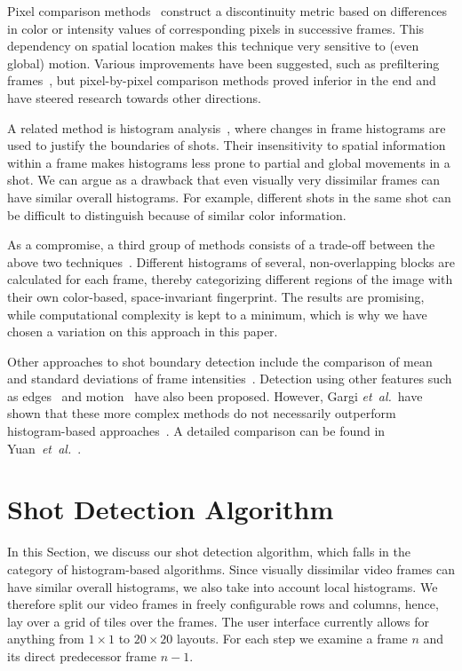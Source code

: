 \documentclass{acm_proc_article-sp}
\begin{document}
Pixel comparison methods~\cite{Hampapur1994, Zhang1993} construct a discontinuity metric based on differences in color or intensity values of corresponding pixels in successive frames. This dependency on spatial location makes this technique very sensitive to (even global) motion. Various improvements have been suggested, such as prefiltering frames~\cite{Zhang1995}, but pixel-by-pixel comparison methods proved inferior in the end and have steered research towards other directions.

A related method is histogram analysis~\cite{Smeaton1999}, where changes in frame histograms are used to justify the boundaries of shots. Their insensitivity to spatial information within a frame makes histograms less prone to partial and global movements in a shot. We can argue as a drawback that even visually very dissimilar frames can have similar overall histograms. For example, different shots in the same shot can be difficult to distinguish because of similar color information.

As a compromise, a third group of methods consists of a trade-off between the above two techniques~\cite{Ahmed1999}. Different histograms of several, non-overlapping blocks are calculated for each frame, thereby categorizing different regions of the image with their own color-based, space-invariant fingerprint. The results are promising, while computational complexity is kept to a minimum, which is why we have chosen a variation on this approach in this paper.

Other approaches to shot boundary detection include the comparison of mean and standard deviations of frame intensities~\cite{Lienhart1999}. Detection using other features such as edges~\cite{Zabih1995} and motion~\cite{Bouthemy1997} have also been proposed. However, Gargi \emph{et~al.}\ have shown that these more complex methods do not necessarily outperform histogram-based approaches~\cite{Gargi2000}. A detailed comparison can be found in Yuan~\emph{et~al.}~\cite{Yuan2007}. 

\section{Shot Detection Algorithm} \label{sec:details-of-algo}
In this Section, we discuss our shot detection algorithm, which falls in the category of histogram-based algorithms.  Since visually dissimilar video frames can have similar overall histograms, we also take into account local histograms. 
We therefore split our video frames in freely configurable rows and columns, hence, lay over a grid of tiles over the frames. The user interface currently allows for anything from $\mathit{1 \times 1}$ to $\mathit{20 \times 20}$ layouts. For each step we examine a frame $\mathit{n}$ and its direct predecessor frame $\mathit{n - 1}$.
\end{document}
